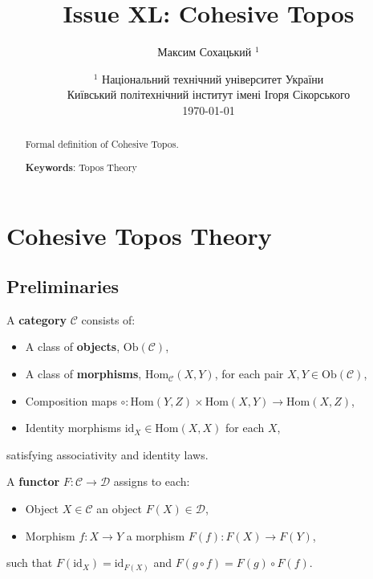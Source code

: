 \documentclass{article}
\begin{document}
\title{Issue XL: Cohesive Topos}
\author{Максим Сохацький $^1$}
\date{ $^1$ Національний технічний університет України \\
       \small Київський політехнічний інститут імені Ігоря Сікорського \\
       \today }

\maketitle

\begin{abstract}

Formal definition of Cohesive Topos.

{\bf Keywords}: Topos Theory \\
\end{abstract}

\ifincludeTOC
  \tableofcontents
\fi

\section{Cohesive Topos Theory}

\subsection{Preliminaries}
A \textbf{category} $\mathcal{C}$ consists of:
\begin{itemize}
  \item A class of \textbf{objects}, $\mathrm{Ob}(\mathcal{C})$,
  \item A class of \textbf{morphisms}, $\mathrm{Hom}_{\mathcal{C}}(X,Y)$, for each pair $X,Y \in \mathrm{Ob}(\mathcal{C})$,
  \item Composition maps $\circ: \mathrm{Hom}(Y,Z) \times \mathrm{Hom}(X,Y) \to \mathrm{Hom}(X,Z)$,
  \item Identity morphisms $\mathrm{id}_X \in \mathrm{Hom}(X,X)$ for each $X$,
\end{itemize}
satisfying associativity and identity laws.


A \textbf{functor} $F: \mathcal{C} \to \mathcal{D}$ assigns to each:
\begin{itemize}
  \item Object $X \in \mathcal{C}$ an object $F(X) \in \mathcal{D}$,
  \item Morphism $f: X \to Y$ a morphism $F(f): F(X) \to F(Y)$,
\end{itemize}
such that $F(\mathrm{id}_X) = \mathrm{id}_{F(X)}$ and $F(g \circ f) = F(g) \circ F(f)$.
\end{document}

